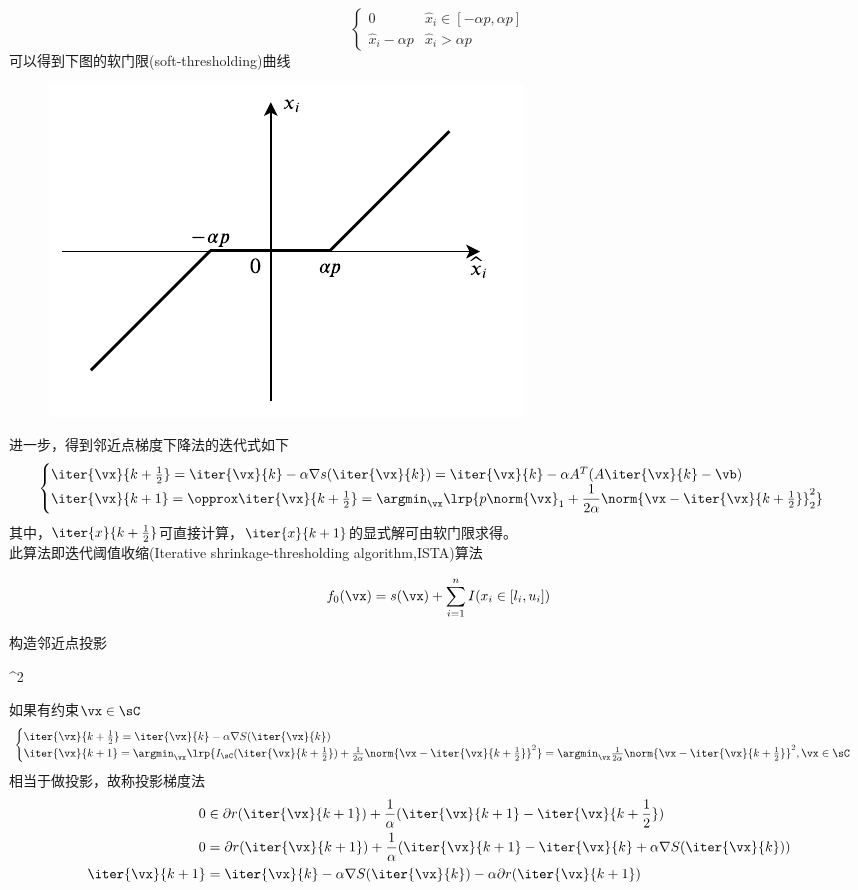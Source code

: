 \begin{analysis}
\[\begin{cases}
    0 & \hat{x}_i\in[-\alpha p,\alpha p]\\
    \hat{x}_i-\alpha p & \hat{x}_i>\alpha p
    \end{cases}\]
    可以得到下图的软门限(soft-thresholding)曲线
    \begin{figure}[H]
    \centering
    \includegraphics[width=0.4\linewidth]{fig/soft-thresholding.pdf}
    \end{figure}

    进一步，得到邻近点梯度下降法的迭代式如下
    \[\begin{cases}
    \iter{\vx}{k+\frac{1}{2}}=\iter{\vx}{k}-\alpha\nabla s(\iter{\vx}{k})=\iter{\vx}{k}-\alpha A^T(A\iter{\vx}{k}-\vb)\\
    \iter{\vx}{k+1}=\opprox \iter{\vx}{k+\frac{1}{2}}=\argmin_\vx\lrp{p\norm{\vx}_1+\dfrac{1}{2\alpha}\norm{\vx-\iter{\vx}{k+\frac{1}{2}}}_2^2}
    \end{cases}\]
    其中，$\iter{x}{k+\frac{1}{2}}$可直接计算，$\iter{x}{k+1}$的显式解可由软门限求得。\\
    此算法即迭代阈值收缩(Iterative shrinkage-thresholding algorithm,ISTA)算法
\end{analysis}

\begin{example}
\[f_0(\vx)=s(\vx)+\sum_{i=1}^nI(x_i\in[l_i,u_i])\]
\end{example}
\begin{analysis}
    构造邻近点投影
\begin{argmini*}
    {}{\norm{\vx-\hat{\vx}}^2}{}{}
\end{argmini*}
如果有约束$\vx\in\sC$
\[\begin{cases}
    \iter{\vx}{k+\frac{1}{2}}=\iter{\vx}{k}-\alpha\nabla S(\iter{\vx}{k})\\
    \iter{\vx}{k+1}=\argmin_\vx \lrp{I_\sC(\iter{\vx}{k+\frac{1}{2}})+\frac{1}{2\alpha}\norm{\vx-\iter{\vx}{k+\frac{1}{2}}}^2}=\argmin_\vx\frac{1}{2\alpha}\norm{\vx-\iter{\vx}{k+\frac{1}{2}}}^2,\vx\in\sC
\end{cases}\]
相当于做投影，故称投影梯度法
    \[\begin{aligned}
        0&\in\partial r(\iter{\vx}{k+1})+\frac{1}{\alpha}(\iter{\vx}{k+1}-\iter{\vx}{k+\frac{1}{2}})\\
        0&=\partial r(\iter{\vx}{k+1})+\frac{1}{\alpha}(\iter{\vx}{k+1}-\iter{\vx}{k}+\alpha\nabla S(\iter{\vx}{k}))\\
        \iter{\vx}{k+1}&=\iter{\vx}{k}-\alpha\nabla S(\iter{\vx}{k})-\alpha\partial r(\iter{\vx}{k+1})
    \end{aligned}\]
\end{analysis}

